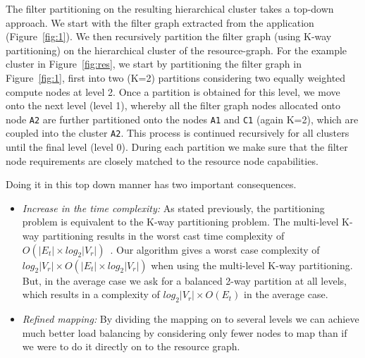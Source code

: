 The filter partitioning on the resulting hierarchical cluster takes a
top-down approach. We start with the filter graph extracted from the
application (Figure~\ref{fig:1}). We then recursively partition the filter
graph (using K-way partitioning) on the hierarchical cluster of the
resource-graph. For the example cluster in Figure~\ref{fig:res}, we
start by partitioning the filter graph in Figure~\ref{fig:1}, first into
two (K=2) partitions considering two equally weighted compute nodes at
level 2. Once a partition is obtained for this level, we move onto the
next level (level 1), whereby all the filter graph nodes allocated onto
node \texttt{A2} are further partitioned onto the nodes \texttt{A1} and
\texttt{C1} (again K=2), which are coupled into the cluster
\texttt{A2}. This process is continued recursively for all clusters until the
final level (level 0). During each partition we make
sure that the filter node requirements are closely matched to the resource
node capabilities.


Doing it in this top down manner has two important consequences.

\begin{itemize}

\item \textit{Increase in the time complexity:} As stated previously,
  the partitioning problem is equivalent to the K-way partitioning
  problem. The multi-level K-way partitioning results in the worst cast
  time complexity of $O(|E_t| \times log_2|V_r|)$~\cite{gkar98}. Our
  algorithm gives a worst case complexity of \mbox{$log_2|V_r| \times
    O(|E_t| \times log_2 |V_r|)$} when using the multi-level K-way
  partitioning. But, in the average case we ask for a balanced 2-way
  partition at all levels, which results in a complexity of $log_2 |V_r|
  \times O (E_t)$ in the average case.

\item \textit{Refined mapping:} By dividing the mapping on to several
  levels we can achieve much better load balancing by considering only
  fewer nodes to map than if we were to do it directly on to the
  resource graph. %

\end{itemize}


